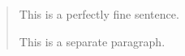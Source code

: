 \begin{abstract}
  This is a perfectly
  fine sentence.

  This is a separate paragraph.
\end{abstract}
